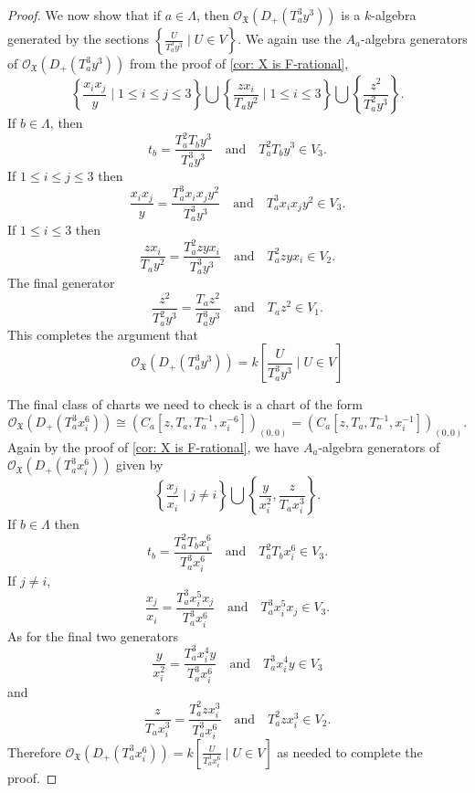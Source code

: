 \documentclass[reqno,11pt]{amsart}
\numberwithin{equation}{section}
\theoremstyle{definition}
\theoremstyle{definition}
\theoremstyle{definition}
\theoremstyle{remark}
\newcommand{\cO}{\mathcal{O}}
\begin{document}
\begin{proof}
    We now show that if $a\in \Lambda$, then $\cO_{\mathfrak{X}}(D_+(T_a^3y^3))$ is a $k$-algebra generated by the sections $\left\{\frac{U}{T_a^3y^3}\mid U\in V\right\}$. We again use the $A_a$-algebra generators of $\cO_{\mathfrak{X}}(D_+(T_a^3y^3))$ from the proof of \cref{cor: X is F-rational}, 
    \[
    \left\{\frac{x_ix_j}{y}\mid 1\leq i\leq j\leq3\right\}\bigcup \left\{\frac{zx_i}{T_ay^2}\mid 1\leq i\leq 3\right\} \bigcup \left\{\frac{z^2}{T_a^2y^3}\right\}.
    \]
    If $b\in\Lambda$, then
    \[
    t_b = \frac{T_a^2T_by^3}{T_a^3y^3}\quad\mbox{and}\quad T_a^2T_by^3\in V_3.
    \]
    If $1\leq i\leq j\leq 3$ then
    \[
    \frac{x_ix_j}{y} = \frac{T_a^3x_ix_jy^2}{T_a^3y^3}\quad\mbox{and}\quad T_a^3x_ix_jy^2\in V_3.
    \]
    If $1\leq i\leq 3$ then
    \[
    \frac{zx_i}{T_ay^2} = \frac{T_a^2zyx_i}{T_a^3y^3}\quad \mbox{and}\quad T_a^2zyx_i\in V_2.
    \]
    The final generator
    \[
    \frac{z^2}{T_a^2y^3} = \frac{T_az^2}{T_a^3y^3}\quad\mbox{and}\quad T_az^2\in V_1.
    \]
    This completes the argument that
    \[
    \cO_\mathfrak{X}(D_+(T_a^3y^3)) = k\left[\frac{U}{T_a^3y^3}\mid U\in V\right]
    \]

    The final class of charts we need to check is a chart of the form 
    \[
    \cO_\mathfrak{X}(D_+(T_a^3x_i^6)) \cong \left(C_a\left[z, T_a,T_a^{-1},x_i^{-6}\right]\right)_{(0,0)} = \left(C_a\left[z, T_a,T_a^{-1},x_i^{-1}\right]\right)_{(0,0)}.
    \]
    Again by the proof of \cref{cor: X is F-rational}, we have $A_a$-algebra generators of $\cO_\mathfrak{X}(D_+(T_a^3x_i^6))$ given by
    \[
    \left\{\frac{x_j}{x_i}\mid j\not=i\right\}\bigcup\left\{\frac{y}{x_i^2}, \frac{z}{T_ax_i^3}\right\}.
    \]
    If $b\in\Lambda$ then
    \[
    t_b = \frac{T_a^2T_bx_i^6}{T_a^3x_i^6}\quad\mbox{and}\quad T_a^2T_bx_i^6\in V_3.
    \]
    If $j\not=i$,
    \[
    \frac{x_j}{x_i} = \frac{T_a^3x_i^5x_j}{T_a^3x_i^6}\quad\mbox{and}\quad T_a^3x_i^5x_j\in V_3.
    \]
    As for the final two generators
    \[
    \frac{y}{x_i^2} = \frac{T_a^3x_i^4y}{T_a^3x_i^6}\quad\mbox{and}\quad T_a^3x_i^4y\in V_3
    \]
    and
    \[
    \frac{z}{T_ax_i^3} = \frac{T_a^2zx_i^3}{T_a^3x_i^6}\quad\mbox{and}\quad T_a^2zx_i^3\in V_2.
    \]
    Therefore $\cO_\mathfrak{X}(D_+(T_a^3x_i^6)) = k\left[\frac{U}{T_a^3x_i^6}\mid U\in V\right]$ as needed to complete the proof.  
\end{proof}
\end{document}
